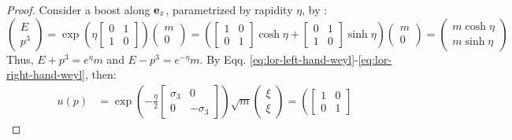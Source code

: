 \begin{proofbox}
  \begin{proof}
    Consider a boost along $ \mathbf{e}_z $, parametrized by rapidity $ \eta $, by :
    \begin{equation*}
      \begin{pmatrix}
        E \\ p^3
      \end{pmatrix}
      = \exp \left( \eta
        \begin{bmatrix}
          0 & 1 \\ 1 & 0
        \end{bmatrix}
      \right)
      \begin{pmatrix}
        m \\ 0
      \end{pmatrix}
      = \left(
        \begin{bmatrix}
          1 & 0 \\ 0 & 1
        \end{bmatrix}
      \cosh \eta +
        \begin{bmatrix}
          0 & 1 \\ 1 & 0
        \end{bmatrix}
      \sinh \eta \right)
      \begin{pmatrix}
        m \\ 0
      \end{pmatrix}
      =
      \begin{pmatrix}
        m \cosh \eta \\ m \sinh \eta
      \end{pmatrix}
    \end{equation*}
    Thus, $ E + p^3 = e^\eta m $ and $ E - p^3 = e^{-\eta} m $. By Eqq. \ref{eq:lor-left-hand-weyl}-\ref{eq:lor-right-hand-weyl}, then:
    \begin{equation*}
      \begin{split}
        u(p) &= \exp \left( - \frac{\eta}{2}
          \begin{bmatrix}
            \sigma_3 & 0 \\ 0 & - \sigma_3
          \end{bmatrix}
        \right) \sqrt{m}
        \begin{pmatrix}
          \xi \\ \xi
        \end{pmatrix} = \left(
                  \begin{bmatrix}
                  1 & 0 \\ 0 & 1

\end{bmatrix}
\end{split}
\end{equation*}
\end{proof}
\end{proofbox}
